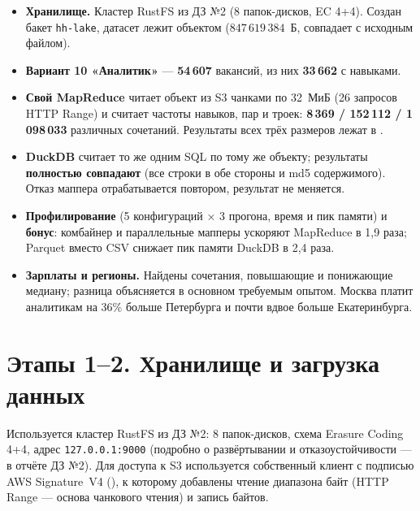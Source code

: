 \begin{itemize}
\item \textbf{Хранилище.} Кластер RustFS из ДЗ №2 (8 папок-дисков, EC 4+4). Создан бакет \texttt{hh-lake}, датасет лежит объектом  ($847\,619\,384$~Б, совпадает с исходным файлом).
\item \textbf{Вариант 10 «Аналитик»} — \textbf{54\,607} вакансий, из них \textbf{33\,662} с навыками.
\item \textbf{Свой MapReduce} читает объект из S3 чанками по 32~МиБ (26 запросов HTTP Range) и считает частоты навыков, пар и троек: \textbf{8\,369 / 152\,112 / 1\,098\,033} различных сочетаний. Результаты всех трёх размеров лежат в .
\item \textbf{DuckDB} считает то же одним SQL по тому же объекту; результаты \textbf{полностью совпадают} (все строки в обе стороны и md5 содержимого). Отказ маппера отрабатывается повтором, результат не меняется.
\item \textbf{Профилирование} (5 конфигураций × 3 прогона, время и пик памяти) и \textbf{бонус}: комбайнер и параллельные мапперы ускоряют MapReduce в 1,9 раза; Parquet вместо CSV снижает пик памяти DuckDB в 2,4 раза.
\item \textbf{Зарплаты и регионы.} Найдены сочетания, повышающие и понижающие медиану; разница объясняется в основном требуемым опытом. Москва платит аналитикам на 36\% больше Петербурга и почти вдвое больше Екатеринбурга.
\end{itemize}

\section{Этапы 1--2. Хранилище и загрузка данных}

Используется кластер RustFS из ДЗ №2: 8 папок-дисков, схема Erasure Coding 4+4, адрес \texttt{127.0.0.1:9000} (подробно о развёртывании и отказоустойчивости --- в отчёте ДЗ №2). Для доступа к S3 используется собственный клиент с подписью AWS Signature~V4 (), к которому добавлены чтение диапазона байт (HTTP Range --- основа чанкового чтения) и запись байтов.



